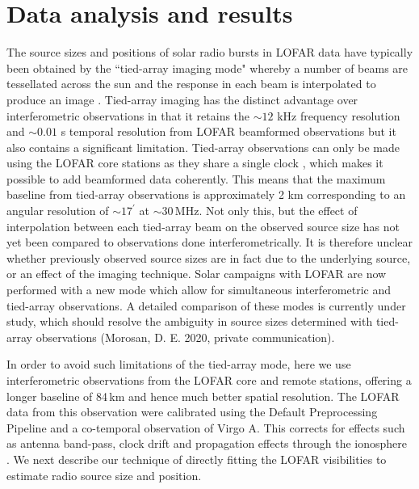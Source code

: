 \section{Data analysis and results} \label{sec:data}
The source sizes and positions of solar radio bursts in LOFAR data have typically been obtained by the ``tied-array imaging mode" \citep{Morosan2014} whereby a number of beams are tessellated across the sun and the response in each beam is interpolated to produce an image \citep[e.g.][]{Reid2017,Kontar2017,Zucca2018, Morosan2019b}. Tied-array imaging has the distinct advantage over interferometric observations in that it retains the ${\sim} 12$ kHz frequency resolution and ${\sim} 0.01$ s temporal resolution from LOFAR beamformed observations but it also contains a significant limitation. Tied-array observations can only be made using the LOFAR core stations as they share a single clock \citep{DeGasperin2019}, which makes it possible to add beamformed data coherently. This means that the maximum baseline from tied-array observations is approximately 2 km corresponding to an angular resolution of ${\sim} 17^\prime$ at ${\sim} 30$\,MHz. Not only this, but the effect of interpolation between each tied-array beam on the observed source size has not yet been compared to observations done interferometrically. It is therefore unclear whether previously observed source sizes are in fact due to the underlying source, or an effect of the imaging technique. Solar campaigns with LOFAR are now performed with a new mode which allow for simultaneous interferometric and tied-array observations. A detailed comparison of these modes is currently under study, which should resolve the ambiguity in source sizes determined with tied-array observations (Morosan, D. E. 2020, private communication). 

In order to avoid such limitations of the tied-array mode, here we use interferometric observations from the LOFAR core and remote stations, offering a longer baseline of 84\,km and hence much better spatial resolution.
The LOFAR data from this observation were calibrated using the Default Preprocessing Pipeline \cite[DPPP;][]{VanDiepen2018} and a co-temporal observation of Virgo A. This corrects for effects such as antenna band-pass, clock drift and propagation effects through the ionosphere \citep{DeGasperin2019}. We next describe our technique of directly fitting the LOFAR visibilities to estimate radio source size and position.

